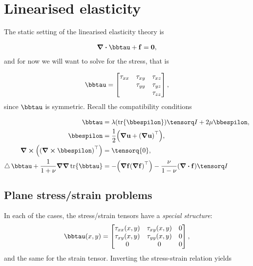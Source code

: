 \documentclass[../main.tex]{subfiles}
\begin{document}
\section{Linearised elasticity}
\label{sec:linearised_elasticity}

The static setting of the linearised elasticity theory is

\begin{align}
\label{eq:static_momentum_balance}
\divergence{\bbtau} + \vb{f} = \vb{0},
\end{align}
and for now we will want to solve for the stress, that is

\[
	\bbtau = \begin{bmatrix}
		\tau_{xx} & \tau_{xy} & \tau_{xz} \\
			  & \tau_{yy} & \tau_{yz} \\
			  & & \tau_{zz}
	\end{bmatrix},
\]
since $\bbtau$ is symmetric. Recall the compatibility conditions

\begin{align}
  \label{eq:compatibility}
  \bbtau &= \lambda \qty(\tr \bbespilon)\identity + 2 \mu \bbespilon, \\
  \bbespilon &= \frac{1}{2}\qty(\grad \vb{u}+ \transpose{\qty(\grad \vb{u})}),\\
  \curl{\qty(\transpose{\qty(\curl{\bbespilon})})} &= \tensorq{0}, \\
  \laplace \bbtau+\frac{1}{1+\nu} \grad \grad \tr \bbtau &= -\qty(\grad \vb{f} \transpose{\qty(\grad \vb{f})}) - \frac{\nu}{1-\nu} \qty(\divergence{\vb{f}})\identity
\end{align}

\subsection{Plane stress/strain problems}
\label{sec:plane_problems}

In each of the cases, the stress/strain tensors have a \textit{special structure}:
\begin{equation}
	\label{eq:plane_structure}
	\bbtau\qty(x,y)=\begin{bmatrix}
		\tau_{xx}\qty(x,y) & \tau_{xy}\qty(x,y) & 0\\
		\tau_{xy}\qty(x,y) & \tau_{yy}\qty(x,y) & 0\\
		0 & 0 & 0
	\end{bmatrix},
\end{equation}
and the same for the strain tensor. Inverting the stress-strain relation yields
\end{document}
